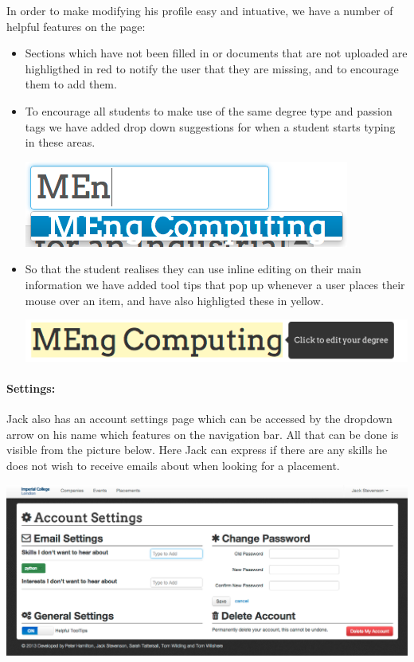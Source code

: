     In order to make modifying his profile easy and intuative, we have a number of helpful features on the page:
    \begin{itemize}
      \item Sections which have not been filled in or documents that are not uploaded are highligthed in red to notify the user that they are missing, and to encourage them to add them.
      \item To encourage all students to make use of the same degree type and passion tags we have added drop down suggestions for when a student starts typing in these areas.

      \begin{center}
      \includegraphics[scale=0.5]{images/user_experiences/student/edit_suggestions}
      \end{center}
      \item So that the student realises they can use inline editing on their main information we have added tool tips that pop up whenever a user places their mouse over an item, and have also highligted these in yellow.
      
      \begin{center}
      \includegraphics[scale=0.5]{images/user_experiences/student/edit_degree_tooltip}
      \end{center}
    \end{itemize} 

  \paragraph{Settings:}
    Jack also has an account settings page which can be accessed by the dropdown arrow on his name which features on the navigation bar. All that can be done is visible from the picture below. Here Jack can express if there are any skills he does not wish to receive emails about when looking for a placement.

    \begin{center}
    \includegraphics[scale=0.3]{images/user_experiences/student/account_settings}
    \end{center}

